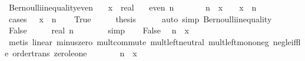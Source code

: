\begin{isabellebody}
\ Bernoulli{\isacharunderscore}{\kern0pt}inequality{\isacharunderscore}{\kern0pt}even{\isacharcolon}{\kern0pt}\isanewline
\ \ \ x\ {\isacharcolon}{\kern0pt}{\isacharcolon}{\kern0pt}\ real\isanewline
\ \ \ {\isachardoublequoteopen}even\ n{\isachardoublequoteclose}\isanewline
\ \ \ \ \ {\isachardoublequoteopen}{}\ {\isacharplus}{\kern0pt}\ n\ {\isacharasterisk}{\kern0pt}\ x\ {\isasymle}\ {\isacharparenleft}{\kern0pt}{}\ {\isacharplus}{\kern0pt}\ x{\isacharparenright}{\kern0pt}\ {\isacharcircum}{\kern0pt}\ n{\isachardoublequoteclose}\isanewline
%
\isadelimproof
%
\endisadelimproof
%
\isatagproof
{}\isamarkupfalse%
\ {\isacharparenleft}{\kern0pt}cases\ {\isachardoublequoteopen}{\isacharminus}{\kern0pt}{}\ {\isasymle}\ x\ {\isasymor}\ n{\isacharequal}{\kern0pt}{}{\isachardoublequoteclose}{\isacharparenright}{\kern0pt}\isanewline
\ \ \isamarkupfalse%
\ True\isanewline
\ \ \isamarkupfalse%
\ \isamarkupfalse%
\ {\isacharquery}{\kern0pt}thesis\isanewline
\ \ \ \ \isamarkupfalse%
\ {\isacharparenleft}{\kern0pt}auto\ simp{\isacharcolon}{\kern0pt}\ Bernoulli{\isacharunderscore}{\kern0pt}inequality{\isacharparenright}{\kern0pt}\isanewline
{}\isamarkupfalse%
\isanewline
\ \ \isamarkupfalse%
\ False\isanewline
\ \ \isamarkupfalse%
\ \isamarkupfalse%
\ {\isachardoublequoteopen}real\ n\ {\isasymge}\ {}{\isachardoublequoteclose}\isanewline
\ \ \ \ \isamarkupfalse%
\ simp\isanewline
\ \ \isamarkupfalse%
\ False\ \isamarkupfalse%
\ {\isachardoublequoteopen}n\ {\isacharasterisk}{\kern0pt}\ x\ {\isasymle}\ {\isacharminus}{\kern0pt}{}{\isachardoublequoteclose}\isanewline
\ \ \ \ \isamarkupfalse%
\ {\isacharparenleft}{\kern0pt}metis\ linear\ minus{\isacharunderscore}{\kern0pt}zero\ mult{\isachardot}{\kern0pt}commute\ mult{\isachardot}{\kern0pt}left{\isacharunderscore}{\kern0pt}neutral\ mult{\isacharunderscore}{\kern0pt}left{\isacharunderscore}{\kern0pt}mono{\isacharunderscore}{\kern0pt}neg\ neg{\isacharunderscore}{\kern0pt}le{\isacharunderscore}{\kern0pt}iff{\isacharunderscore}{\kern0pt}le\ order{\isacharunderscore}{\kern0pt}trans\ zero{\isacharunderscore}{\kern0pt}le{\isacharunderscore}{\kern0pt}one{\isacharparenright}{\kern0pt}\isanewline
\ \ \isamarkupfalse%
\ \isamarkupfalse%
\ {\isachardoublequoteopen}{}\ {\isacharplus}{\kern0pt}\ n\ {\isacharasterisk}{\kern0pt}\ x\ {\isasymle}\ {}{\isachardoublequoteclose}\isanewline

\end{isabellebody}
